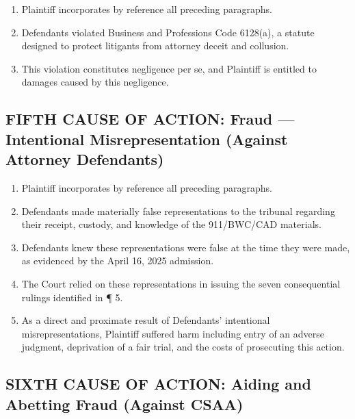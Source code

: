 \begin{enumerate}
\def\labelenumi{\arabic{enumi}.}
\setcounter{enumi}{63}
\item
  Plaintiff incorporates by reference all preceding paragraphs.
\item
  Defendants violated Business and Professions Code \textsection{} 6128(a), a statute designed to protect litigants from attorney deceit and collusion.
\item
  This violation constitutes negligence per se, and Plaintiff is entitled to damages caused by this negligence.
\end{enumerate}

\subsection{FIFTH CAUSE OF ACTION: Fraud --- Intentional Misrepresentation (Against Attorney Defendants)}\label{fifth-cause-of-action-fraud-intentional-misrepresentation-against-attorney-defendants}

\begin{enumerate}
\def\labelenumi{\arabic{enumi}.}
\setcounter{enumi}{66}
\item
  Plaintiff incorporates by reference all preceding paragraphs.
\item
  Defendants made materially false representations to the tribunal regarding their receipt, custody, and knowledge of the 911/BWC/CAD materials.
\item
  Defendants knew these representations were false at the time they were made, as evidenced by the April 16, 2025 admission.
\item
  The Court relied on these representations in issuing the seven consequential rulings identified in ¶ 5.
\item
  As a direct and proximate result of Defendants' intentional misrepresentations, Plaintiff suffered harm including entry of an adverse judgment, deprivation of a fair trial, and the costs of prosecuting this action.
\end{enumerate}

\subsection{SIXTH CAUSE OF ACTION: Aiding and Abetting Fraud (Against CSAA)}\label{sixth-cause-of-action-aiding-and-abetting-fraud-against-csaa}

